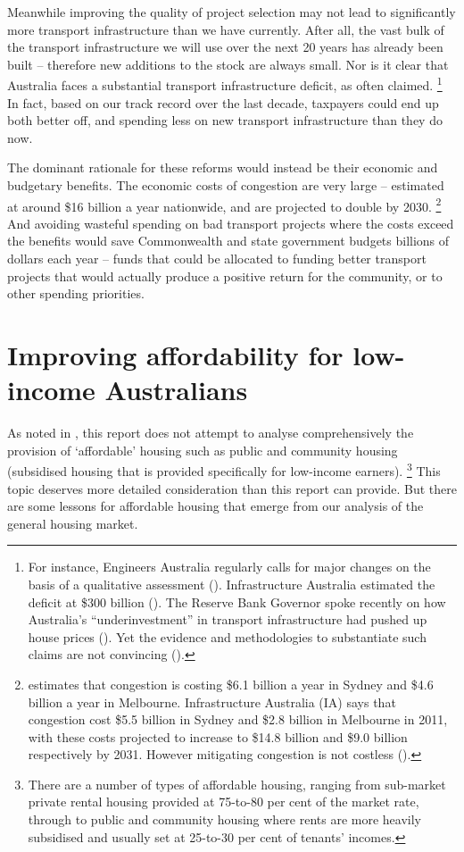 Meanwhile improving the quality of project selection may not lead to significantly more transport infrastructure than we have currently. 
After all, the vast bulk of the transport infrastructure we will use over the next 20 years has already been built -- therefore new additions to the stock are always small. Nor is it clear that Australia faces a substantial transport infrastructure deficit, as often claimed.%
    \footnote{For instance, Engineers Australia regularly calls for major changes on the basis of a qualitative assessment (\textcite{Australia2010a}).
    Infrastructure Australia estimated the deficit at \$300 billion (\textcite[][6]{Australia2013}).
    The Reserve Bank Governor spoke recently on how Australia's ``underinvestment'' in transport infrastructure had pushed up house prices (\textcite{Lowe-2017-Speech-RBA-Dinner}).
    Yet the evidence and methodologies to substantiate such claims are not convincing (\textcite{TerrillCoates-2016-infrastructuredeficit}).} 
In fact, based on our track record over the last decade, taxpayers could end up both better off, and spending less on new transport infrastructure than they do now.

The dominant rationale for these reforms would instead be their economic and budgetary benefits. The economic costs of congestion are very large -- estimated at around \$16 billion a year nationwide, and are projected to double by 2030.%
    \footnote{\textcite[][1]{BITRE-2015-congestion-costs} estimates that congestion is costing \$6.1 billion a year in Sydney and \$4.6 billion a year in Melbourne. Infrastructure Australia (IA) says that congestion cost \$5.5 billion in Sydney and \$2.8 billion in Melbourne in 2011, with these costs projected to increase to \$14.8 billion and \$9.0 billion respectively by 2031. However mitigating congestion is not costless (\textcite[][12--13]{Terrill-2017-Road-congestion}).}
And avoiding wasteful spending on bad transport projects where the costs exceed the benefits would save Commonwealth and state government budgets billions of dollars each year -- funds that could be allocated to funding better transport projects that would actually produce a positive return for the community, or to other spending priorities.

\section{Improving affordability for low-income Australians}\label{sec:helping-the-bottom}

As noted in , this report does not attempt to analyse comprehensively the provision of `affordable' housing such as public and community housing (subsidised housing that is provided specifically for low-income earners).%
     \footnote{There are a number of types of affordable housing, ranging from sub-market private rental housing provided at 75-to-80 per cent of the market rate, through to public and community housing where rents are more heavily subsidised and usually set at 25-to-30 per cent of tenants' incomes.}
This topic deserves more detailed consideration than this report can provide.
But there are some lessons for affordable housing that emerge from our analysis of the general housing market.

